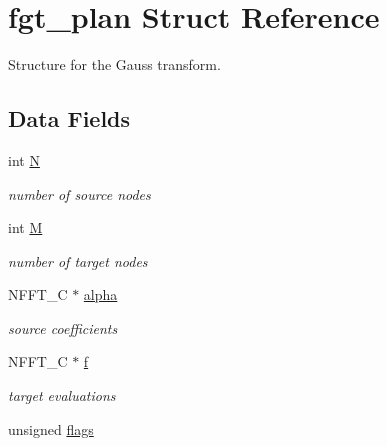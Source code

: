 \hypertarget{structfgt__plan}{\section{fgt\-\_\-plan Struct Reference}
\label{structfgt__plan}
}


Structure for the Gauss transform.  


\subsection*{Data Fields}
\begin{DoxyCompactItemize}
\item 
\hypertarget{structfgt__plan_afbd9662ab140a1c55ded8928b2be3e87}{int \hyperlink{structfgt__plan_afbd9662ab140a1c55ded8928b2be3e87}{N}}\label{structfgt__plan_afbd9662ab140a1c55ded8928b2be3e87}

\begin{DoxyCompactList}\small\item\em number of source nodes \end{DoxyCompactList}\item 
\hypertarget{structfgt__plan_a64030dcfd57263db29ff440c6cdd26aa}{int \hyperlink{structfgt__plan_a64030dcfd57263db29ff440c6cdd26aa}{M}}\label{structfgt__plan_a64030dcfd57263db29ff440c6cdd26aa}

\begin{DoxyCompactList}\small\item\em number of target nodes \end{DoxyCompactList}\item 
\hypertarget{structfgt__plan_a3c450716b1575844bf3a36a69b31f7f7}{N\-F\-F\-T\-\_\-\-C $\ast$ \hyperlink{structfgt__plan_a3c450716b1575844bf3a36a69b31f7f7}{alpha}}\label{structfgt__plan_a3c450716b1575844bf3a36a69b31f7f7}

\begin{DoxyCompactList}\small\item\em source coefficients \end{DoxyCompactList}\item 
\hypertarget{structfgt__plan_a755d4fb05a19ac12c7d9b31c2fa573c6}{N\-F\-F\-T\-\_\-\-C $\ast$ \hyperlink{structfgt__plan_a755d4fb05a19ac12c7d9b31c2fa573c6}{f}}\label{structfgt__plan_a755d4fb05a19ac12c7d9b31c2fa573c6}

\begin{DoxyCompactList}\small\item\em target evaluations \end{DoxyCompactList}\item 
\hypertarget{structfgt__plan_a081f3a5e595025f27b4bfd89a3f74869}{unsigned \hyperlink{structfgt__plan_a081f3a5e595025f27b4bfd89a3f74869}{flags}}\label{structfgt__plan_a081f3a5e595025f27b4bfd89a3f74869}


\end{DoxyCompactItemize}
